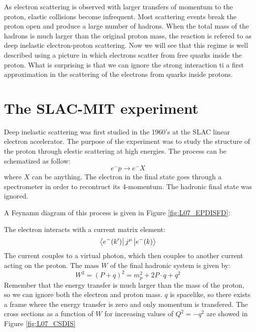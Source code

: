 \documentclass[../../main/main.tex]{subfiles}
\begin{document}
As electron scattering is observed with larger transfers of momentum to the proton, elastic collisions become infrequent. Most scattering events break the proton open and produce a large number of hadrons. When the total mass of the hadrons is much larger than the original proton mass, the reaction is refered to as deep inelastic electron-proton scattering. Now we will see that this regime is well described using a picture in which electrons scatter from free quarks inside the proton. What is surprising is that we can ignore the strong interaction ti a first approximation in the scattering of the electrons from quarks inside protons.





\section{The SLAC-MIT experiment}
Deep inelastic scattering was first studied in the 1960's at the SLAC linear electron accelerator. The purpose of the experiment was to study the structure of the proton through elestic scattering at high energies. The process can be schematized as follow:
\begin{equation}
	e^-p
	\longrightarrow
	e^-X
	\label{eq:L07_DISEP}
\end{equation}
where \( X \) can be anything. The electron in the final state goes through a spectrometer in order to recontruct its 4-momentum. The hadronic final state was ignored.

A Feynamn diagram of this process is given in Figure \ref{fig:L07_EPDISFD}:

The electron interacts with a current matrix element:
\begin{equation}
	\bra{e^-(k')} j^\mu \ket{e^-(k)}
	\label{eq:}
\end{equation}
The current couples to a virtual photon, which then couples to another current acting on the proton. The mass \( W \) of the final hadronic system is given by:
\begin{equation}
	W^2
	=
	(P+q)^2
	=
	m^2_p + 2P \cdot q + q^2
	\label{eq:}
\end{equation}
Remember that the energy transfer is much larger than the mass of the proton, so we can ignore both the electron and proton mass. \( q \) is spacelike, so there exists a frame where the energy transfer is zero and only momentum is transfered. The cross sections as a function of \( W \) for increasing values of \( Q^2 = - q^2 \) are showed in Figure \ref{fig:L07_CSDIS}
\end{document}
